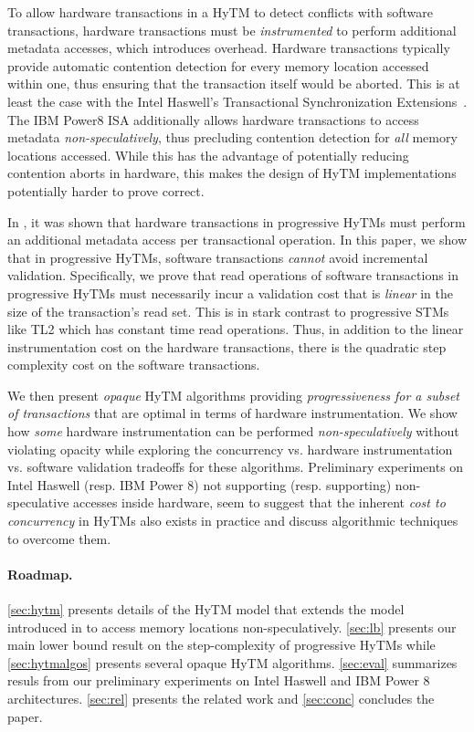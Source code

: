 To allow hardware transactions in a HyTM to detect conflicts with software transactions, 
hardware transactions must be \emph{instrumented} to perform additional metadata accesses, which introduces overhead.
Hardware transactions typically provide automatic contention detection for every memory location accessed within one,
thus ensuring that the transaction itself would be aborted.
This is at least the case with the Intel Haswell's Transactional Synchronization Extensions~\cite{haswell}.
The IBM Power8 ISA additionally allows hardware transactions to access metadata \emph{non-speculatively}, thus precluding
contention detection for \emph{all} memory locations accessed. While this has the advantage of potentially reducing contention aborts
in hardware, this makes the design of HyTM implementations potentially harder to prove correct.

In \cite{htmdisc15}, it was shown that hardware transactions in progressive HyTMs must perform
an additional metadata access per transactional operation.
In this paper, we show that in progressive HyTMs, 
software transactions \textit{cannot} avoid incremental validation.
Specifically, we prove that read operations of software transactions in progressive HyTMs
must necessarily incur a validation cost that is \emph{linear} 
in the size of the transaction's read set. 
This is in stark contrast to progressive STMs like TL2 which has constant time read operations.
Thus, in addition to the linear instrumentation cost on the hardware transactions, there is the quadratic
step complexity cost on the software transactions.

We then present \emph{opaque} HyTM algorithms providing \emph{progressiveness for a subset of transactions} that are  %
optimal in terms of hardware instrumentation. We show 
how \emph{some} hardware instrumentation can be performed \textit{non-speculatively} without violating opacity while exploring the concurrency vs. hardware instrumentation vs. software validation
tradeoffs for these algorithms.
Preliminary experiments on Intel Haswell (resp. IBM Power 8) not supporting (resp. supporting) non-speculative accesses inside hardware,
seem to suggest that the inherent \emph{cost to concurrency} in HyTMs also exists in practice and discuss algorithmic techniques to overcome them.

\paragraph{Roadmap.}
\cref{sec:hytm} presents details of the HyTM model that extends the model introduced in \cite{htmdisc15} 
to access memory locations non-speculatively.
\cref{sec:lb} presents our main lower bound result on the step-complexity of progressive HyTMs
while \cref{sec:hytmalgos} presents several opaque HyTM algorithms.
\cref{sec:eval} summarizes resuls from our preliminary experiments on Intel Haswell and IBM Power 8 architectures.
\cref{sec:rel} presents the related work and \cref{sec:conc} concludes the paper.
%